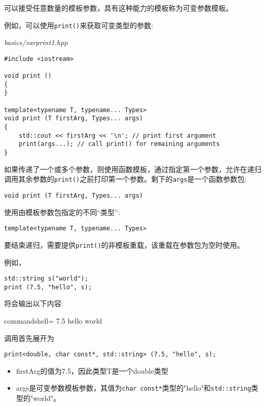 

可以接受任意数量的模板参数，具有这种能力的模板称为可变参数模板。


例如，可以使用\texttt{print()}来获取可变类型的参数:

\noindent
\textit{basics/varprint1.hpp}
\begin{lstlisting}[style=styleCXX]
#include <iostream>

void print ()
{
}

template<typename T, typename... Types>
void print (T firstArg, Types... args)
{
	std::cout << firstArg << '\n'; // print first argument
	print(args...); // call print() for remaining arguments
}
\end{lstlisting}

如果传递了一个或多个参数，则使用函数模板，通过指定第一个参数，允许在递归调用其余参数的\texttt{print()}之前打印第一个参数。剩下的\texttt{args}是一个函数参数包:

\begin{lstlisting}[style=styleCXX]
void print (T firstArg, Types... args)
\end{lstlisting}

使用由模板参数包指定的不同“类型”:

\begin{lstlisting}[style=styleCXX]
template<typename T, typename... Types>
\end{lstlisting}

要结束递归，需要提供\texttt{print()}的非模板重载，该重载在参数包为空时使用。

例如，

\begin{lstlisting}[style=styleCXX]
std::string s("world");
print (7.5, "hello", s);
\end{lstlisting}

将会输出以下内容:

\begin{tcblisting}{commandshell={}}
7.5
hello
world
\end{tcblisting}

调用首先展开为

\begin{lstlisting}[style=styleCXX]
print<double, char const*, std::string> (7.5, "hello", s);
\end{lstlisting}

\begin{itemize}
\item 
firstArg的值为7.5，因此类型T是一个double类型

\item 
args是可变参数模板参数，其值为\texttt{char const*}类型的"hello"和\texttt{std::string}类型的"world"。
\end{itemize}


